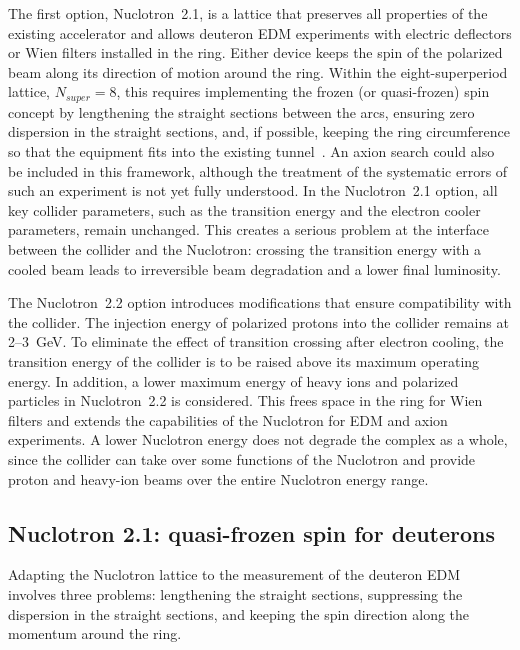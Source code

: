 The first option, Nuclotron~2.1, is a lattice that preserves all properties of
the existing accelerator and allows deuteron EDM experiments with electric
deflectors or Wien filters installed in the ring. Either device keeps the spin
of the polarized beam along its direction of motion around the ring. Within the
eight-superperiod lattice, $N_{super} = 8$, this requires implementing the
frozen (or quasi-frozen) spin concept by lengthening the straight sections
between the arcs, ensuring zero dispersion in the straight sections, and, if
possible, keeping the ring circumference so that the equipment fits into the
existing tunnel~\cite{Senichev:2023vtx,Senichev:2024vhw}. An axion search could also be included in this framework,
although the treatment of the systematic errors of such an experiment is not
yet fully understood. In the Nuclotron~2.1 option, all key collider
parameters, such as the transition energy and the electron cooler parameters,
remain unchanged. This creates a serious problem at the interface between the
collider and the Nuclotron: crossing the transition energy with a cooled beam
leads to irreversible beam degradation and a lower final luminosity.

The Nuclotron~2.2 option introduces modifications that ensure compatibility
with the collider. The injection energy of polarized protons into the collider
remains at 2--\SI{3}{GeV}. To eliminate the effect of transition crossing after
electron cooling, the transition energy of the collider is to be raised above
its maximum operating energy. In addition, a lower maximum energy of heavy ions
and polarized particles in Nuclotron~2.2 is considered. This frees space in the
ring for Wien filters and extends the capabilities of the Nuclotron for EDM and
axion experiments. A lower Nuclotron energy does not degrade the complex as a
whole, since the collider can take over some functions of the Nuclotron and
provide proton and heavy-ion beams over the entire Nuclotron energy range.

\subsection{Nuclotron 2.1: quasi-frozen spin for deuterons}

Adapting the Nuclotron lattice to the measurement of the deuteron EDM involves
three problems: lengthening the straight sections, suppressing the dispersion
in the straight sections, and keeping the spin direction along the momentum
around the ring.

